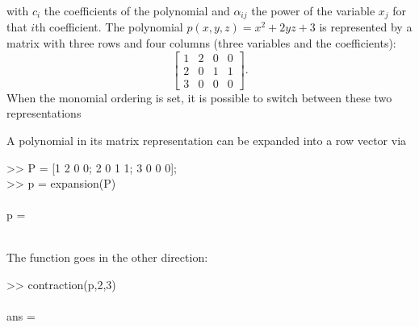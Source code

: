 \documentclass{manual}
\begin{document}
            with $c_i$ the coefficients of the polynomial and $\alpha_{ij}$ the power of the variable $x_j$ for that $i$th coefficient.
            The polynomial $p(x,y,z) = x^2 + 2 y z + 3$ is represented by a matrix with three rows and four columns (three variables and the coefficients):
            \begin{equation}
                \begin{bmatrix}
                    1 & 2 & 0 & 0 \\
                    2 & 0 & 1 & 1 \\
                    3 & 0 & 0 & 0
                \end{bmatrix}.
            \end{equation} 
            When the monomial ordering is set, it is possible to switch between these two representations
            \begin{code}
                A polynomial in its matrix representation can be expanded into a row vector via 
                \begin{codeblock}
                    >> P = {[1 2 0 0; 2 0 1 1; 3 0 0 0]}; \\
                    >> p = expansion(P) \\ \phantom{-} \\
                    p = \\
                              \\
                \end{codeblock}
                \noindent The function  goes in the other direction:
                \begin{codeblock}
                    >> contraction(p,2,3) \\ \phantom{-} \\
                    ans = \\
                        \\
                        \\
                       
                \end{codeblock}
            \end{code}
            
\end{document}
